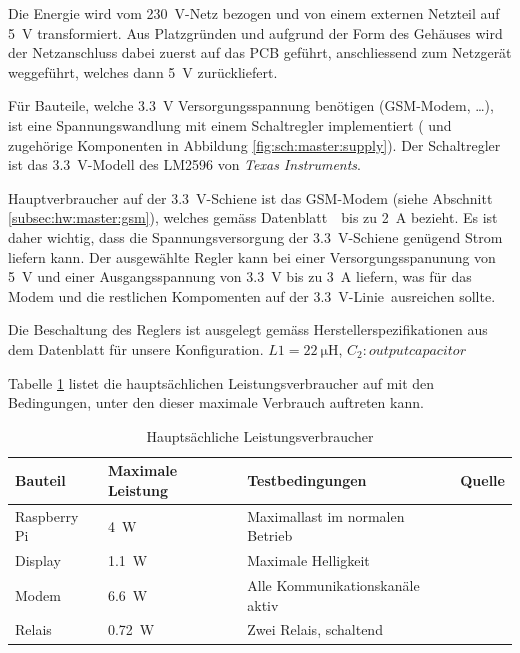 Die  Energie wird  vom  \SI{230}{\volt}-Netz bezogen  und  von einem  externen
Netzteil auf \SI{5}{\volt} transformiert. Aus  Platzgr\"unden und aufgrund der
Form des Geh\"auses wird der Netzanschluss dabei zuerst auf das PCB gef\"uhrt,
anschliessend  zum   Netzger\"at  weggef\"uhrt,  welches   dann  \SI{5}{\volt}
zur\"uckliefert.

F\"ur   Bauteile,  welche   \SI{3.3}{\volt}  Versorgungsspannung   ben\"otigen
(GSM-Modem,  \ldots),  ist  eine   Spannungswandlung  mit  einem  Schaltregler
implementiert   (   und   zugeh\"orige  Komponenten   in   Abbildung
\ref{fig:sch:master:supply}). Der Schaltregler  ist das \SI{3.3}{\volt}-Modell
des LM2596 von \emph{Texas Instruments}.

Hauptverbraucher   auf   der   \SI{3.3}{\volt}-Schiene   ist   das   GSM-Modem
(siehe     Abschnitt     \ref{subsec:hw:master:gsm}),     welches     gem\"ass
Datenblatt~\cite{ref:sim900:1}~bis   zu    \SI{2}{\ampere}   bezieht. Es   ist
daher  wichtig,  dass   die  Spannungsversorgung  der  \SI{3.3}{\volt}-Schiene
gen\"ugend  Strom  liefern  kann. Der  ausgew\"ahlte  Regler  kann  bei  einer
Versorgungsspanunung   von  \SI{5}{\volt}   und  einer   Ausgangsspannung  von
\SI{3.3}{\volt} bis  zu \SI{3}{\ampere} liefern,  was f\"ur das Modem  und die
restlichen Kompomenten auf  der \SI{3.3}{\volt}-Linie~ausreichen
sollte.

Die Beschaltung  des Reglers ist ausgelegt  gem\"ass Herstellerspezifikationen
aus dem Datenblatt \cite{ref:lm2596}  f\"ur unsere Konfiguration. $L1 = \SI{22}{\micro\henry}$, $C_2: output capacitor$


Tabelle  \ref{tab:hw:master:supply:consumption}  listet die  haupts\"achlichen
Leistungsverbraucher  auf  mit  den  Bedingungen, unter  den  dieser  maximale
Verbrauch auftreten kann.

\begin{table}[h!tb]
    \caption{Haupts\"achliche Leistungsverbraucher}
    \label{tab:hw:master:supply:consumption}
    \small
    \begin{tabular}{llll}
        \toprule
        \textbf{Bauteil} & \textbf{Maximale Leistung} & \textbf{Testbedingungen} & \textbf{Quelle} \\
        \midrule
        Raspberry Pi & \SI{4}{W}    & Maximallast im normalen Betrieb  & \cite{ref:raspipower} \\
        Display      & \SI{1.1}{W}  & Maximale Helligkeit              & \cite{datasheet:display} \\
        Modem        & \SI{6.6}{W}  & Alle Kommunikationskanäle aktiv  & \cite{ref:modemrefdesign} \\
        Relais       & \SI{0.72}{W} & Zwei Relais, schaltend           & \cite{datasheet:finder36relais} \\
        \bottomrule
    \end{tabular}
\end{table}


